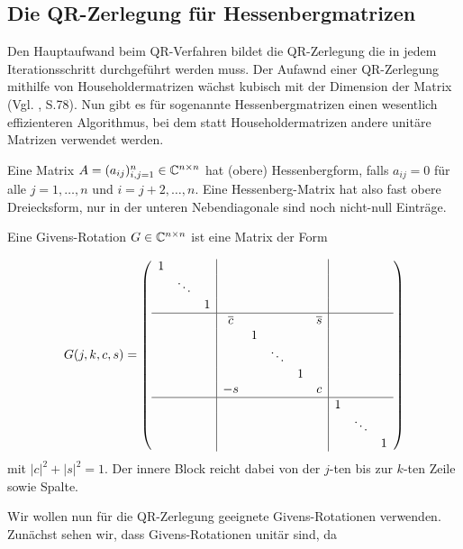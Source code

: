 \documentclass{article}
\begin{document}
\begin{theorem}
\subsection{Die QR-Zerlegung für Hessenbergmatrizen}

Den Hauptaufwand beim QR-Verfahren bildet die QR-Zerlegung die in jedem Iterationsschritt durchgeführt werden muss. Der Aufawnd einer QR-Zerlegung mithilfe von Householdermatrizen wächst kubisch mit der Dimension der Matrix (Vgl. \cite{Num}, S.78). Nun gibt es für sogenannte Hessenbergmatrizen einen wesentlich effizienteren Algorithmus, bei dem statt Householdermatrizen andere unitäre Matrizen verwendet werden.

\begin{definition}
	Eine Matrix $A = (a_{ij})_{i,j = 1}^n \in \mathbb{C}^{n \times n}$ hat (obere) Hessenbergform, falls $a_{ij} = 0$ für alle $j = 1,\dots,n$ und $i = j+2, \dots, n$. Eine Hessenberg-Matrix hat also fast obere Dreiecksform, nur in der unteren Nebendiagonale sind noch nicht-null Einträge.
\end{definition}

\begin{definition}
	Eine Givens-Rotation $G \in \mathbb{C}^{n\times n}$ ist eine Matrix der Form

	\begin{align*}
	G(j,k,c,s)  = \left(\begin{array}{ccc|ccccc|ccc}
	1 &  &  & & & & & & &\\
	& \ddots & & & & & & & & &\\
	& & 1 & & & & & & & \\
	\hline
	& & &  \overline{c} & & & & \overline{s} & & &\\
	& & & & 1 & & & & & &\\
	& & & & & \ddots & & & & &\\
	& & & & &  &1 & & & &\\
	& & & -s & & & & c & & &\\
	\hline
	& & & & & & & & 1 & &\\
	& & & & & & & & & \ddots &\\
	& & & & & & & & & & 1\\
	\end{array}\right)
	\end{align*}
	mit $|c|^2 + |s|^2 = 1$. Der innere Block reicht dabei von der $j$-ten bis zur $k$-ten Zeile sowie Spalte.
\end{definition}


Wir wollen nun für die QR-Zerlegung geeignete Givens-Rotationen verwenden. Zunächst sehen wir, dass Givens-Rotationen unitär sind, da


\end{theorem}
\end{document}
